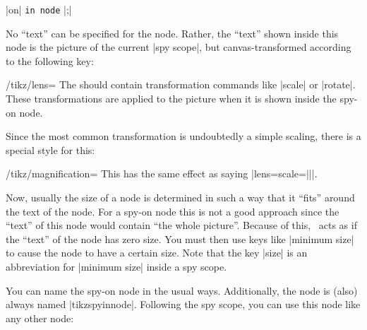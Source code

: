 \begin{command}{\spy {} |on|  \texttt{in node} |;|}
\begin{enumerate}
\begin{codeexample}[]
\end{codeexample}
            No ``text'' can be specified for the node. Rather, the ``text''
            shown inside this node is the picture of the current |spy scope|,
            but canvas-transformed according to the following key:
            \begin{key}{/tikz/lens=}
                The  should contain transformation commands like
                |scale| or |rotate|. These transformations are applied to the
                picture when it is shown inside the spy-on node.
            \end{key}
            Since the most common transformation is undoubtedly a simple
            scaling, there is a special style for this:
            \begin{key}{/tikz/magnification=}
                This has the same effect as saying
                |lens={scale=||}|.
            \end{key}
            Now, usually the size of a node is determined in such a way that it
            ``fits'' around the text of the node. For a spy-on node this is not
            a good approach since the ``text'' of this node would contain ``the
            whole picture''. Because of this, \tikzname\ acts as if the
            ``text'' of the node has zero size. You must then use keys like
            |minimum size| to cause the node to have a certain size. Note that
            the key |size| is an abbreviation for |minimum size| inside a spy
            scope.

            You can name the spy-on node in the usual ways. Additionally, the
            node is (also) always named |tikzspyinnode|. Following the spy
            scope, you can use this node like any other node:
\begin{codeexample}[]
\end{codeexample}
\end{enumerate}
\end{command}
